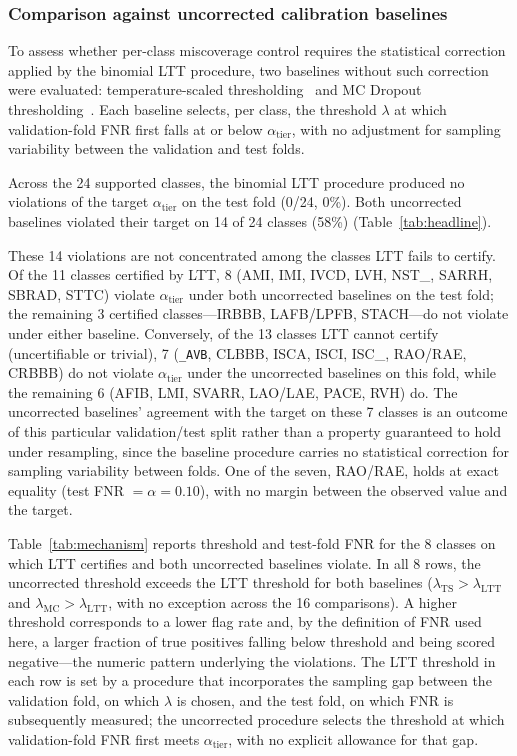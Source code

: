 \subsubsection{Comparison against uncorrected calibration baselines}

To assess whether per-class miscoverage control requires the statistical correction
applied by the binomial LTT procedure, two baselines without such correction were
evaluated: temperature-scaled thresholding~\cite{} and MC Dropout
thresholding~\cite{}.
Each baseline selects, per class, the threshold $\lambda$ at which
validation-fold FNR first falls at or below $\alpha_\mathrm{tier}$, with no
adjustment for sampling variability between the validation and test folds.

Across the 24 supported classes, the binomial LTT procedure produced no violations
of the target $\alpha_\mathrm{tier}$ on the test fold (0/24, 0\%).
Both uncorrected baselines violated their target on 14 of 24 classes (58\%)
(Table~\ref{tab:headline}).

These 14 violations are not concentrated among the classes LTT fails to certify.
Of the 11 classes certified by LTT, 8 (AMI, IMI, IVCD, LVH, NST\_, SARRH, SBRAD,
STTC) violate $\alpha_\mathrm{tier}$ under both uncorrected baselines on the test
fold; the remaining 3 certified classes---IRBBB, LAFB/LPFB, STACH---do not violate
under either baseline.
Conversely, of the 13 classes LTT cannot certify (uncertifiable or trivial),
7 (\texttt{\_AVB}, CLBBB, ISCA, ISCI, ISC\_, RAO/RAE, CRBBB) do not violate
$\alpha_\mathrm{tier}$ under the uncorrected baselines on this fold, while the
remaining 6 (AFIB, LMI, SVARR, LAO/LAE, PACE, RVH) do.
The uncorrected baselines' agreement with the target on these 7 classes is an
outcome of this particular validation/test split rather than a property guaranteed
to hold under resampling, since the baseline procedure carries no statistical
correction for sampling variability between folds.
One of the seven, RAO/RAE, holds at exact equality (test FNR $=\alpha{=}0.10$),
with no margin between the observed value and the target.

Table~\ref{tab:mechanism} reports threshold and test-fold FNR for the 8 classes on
which LTT certifies and both uncorrected baselines violate.
In all 8 rows, the uncorrected threshold exceeds the LTT threshold for both
baselines ($\lambda_\mathrm{TS}>\lambda_\mathrm{LTT}$ and
$\lambda_\mathrm{MC}>\lambda_\mathrm{LTT}$, with no exception across the 16
comparisons).
A higher threshold corresponds to a lower flag rate and, by the definition of FNR
used here, a larger fraction of true positives falling below threshold and being
scored negative---the numeric pattern underlying the violations.
The LTT threshold in each row is set by a procedure that incorporates the sampling
gap between the validation fold, on which $\lambda$ is chosen, and the test fold,
on which FNR is subsequently measured; the uncorrected procedure selects the
threshold at which validation-fold FNR first meets $\alpha_\mathrm{tier}$, with no
explicit allowance for that gap.

